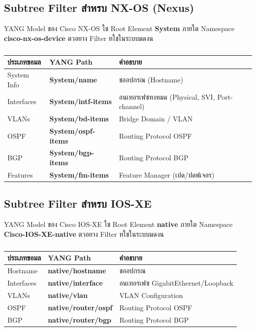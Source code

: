 \subsection{Subtree Filter สำหรบ NX-OS (Nexus)}
\hspace*{1.3em}
YANG Model ของ Cisco NX-OS ใช Root Element \textbf{System} ภายใต Namespace \textbf{cisco-nx-os-device} ตวอยาง Filter ทใชในระบบมดงน

\begin{table}[H]
\centering
\caption{}
\label{tabD:NxosFilters}
\begin{tabularx}{\textwidth}{|l|l|X|}
\hline
\textbf{ประเภทขอมล} & \textbf{YANG Path} & \textbf{คำอธบาย} \\
\hline
System Info & \textbf{System/name} & ชออปกรณ (Hostname) \\
\hline
Interfaces & \textbf{System/intf-items} & อนเทอรเฟซทงหมด (Physical, SVI, Port-channel) \\
\hline
VLANs & \textbf{System/bd-items} & Bridge Domain / VLAN \\
\hline
OSPF & \textbf{System/ospf-items} & Routing Protocol OSPF \\
\hline
BGP & \textbf{System/bgp-items} & Routing Protocol BGP \\
\hline
Features & \textbf{System/fm-items} & Feature Manager (เปด/ปดฟเจอร) \\
\hline
\end{tabularx}
\end{table}

\subsection{Subtree Filter สำหรบ IOS-XE}
\hspace*{1.3em}
YANG Model ของ Cisco IOS-XE ใช Root Element \textbf{native} ภายใต Namespace \textbf{Cisco-IOS-XE-native} ตวอยาง Filter ทใชในระบบมดงน

\begin{table}[H]
\centering
\caption{}
\label{tabD:IosXeFilters}
\begin{tabularx}{\textwidth}{|l|l|X|}
\hline
\textbf{ประเภทขอมล} & \textbf{YANG Path} & \textbf{คำอธบาย} \\
\hline
Hostname & \textbf{native/hostname} & ชออปกรณ \\
\hline
Interfaces & \textbf{native/interface} & อนเทอรเฟซ GigabitEthernet/Loopback \\
\hline
VLANs & \textbf{native/vlan} & VLAN Configuration \\
\hline
OSPF & \textbf{native/router/ospf} & Routing Protocol OSPF \\
\hline
BGP & \textbf{native/router/bgp} & Routing Protocol BGP \\
\hline
\end{tabularx}
\end{table}


